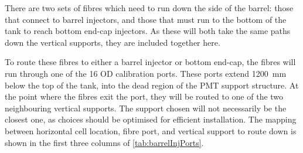 \documentclass[a4paper,11pt]{article}
\begin{document}
There are two sets of fibres which need to run down the side of the barrel: those that connect to barrel injectors, and those that must run to the bottom of the tank to reach bottom end-cap injectors. As these will both take the same paths down the vertical supports, they are included together here. 

To route these fibres to either a barrel injector or bottom end-cap, the fibres will run through one of the 16 OD calibration ports. These ports extend 1200~mm below the top of the tank, into the dead region of the PMT support structure. At the point where the fibres exit the port, they will be routed to one of the two neighbouring vertical supports. The support chosen will not necessarily be the closest one, as choices should be optimised for efficient installation. The mapping between horizontal cell location, fibre port, and vertical support to route down is shown in the first three columns of \cref{tab:barrelInjPorts}.
\end{document}
